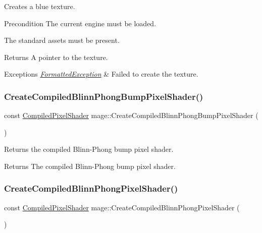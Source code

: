 Creates a blue texture.

\begin{DoxyPrecond}{Precondition}
The current engine must be loaded. 

The standard assets must be present. 
\end{DoxyPrecond}
\begin{DoxyReturn}{Returns}
A pointer to the texture. 
\end{DoxyReturn}

\begin{DoxyExceptions}{Exceptions}
{\em \hyperlink{structmage_1_1_formatted_exception}{Formatted\+Exception}} & Failed to create the texture. \\
\hline
\end{DoxyExceptions}
\hypertarget{namespacemage_a21628580bef67e16e3a9a748cd9abd68}{}\label{namespacemage_a21628580bef67e16e3a9a748cd9abd68} 
\subsubsection{\texorpdfstring{Create\+Compiled\+Blinn\+Phong\+Bump\+Pixel\+Shader()}{CreateCompiledBlinnPhongBumpPixelShader()}}
{\footnotesize\ttfamily const \hyperlink{structmage_1_1_compiled_pixel_shader}{Compiled\+Pixel\+Shader} mage\+::\+Create\+Compiled\+Blinn\+Phong\+Bump\+Pixel\+Shader (\begin{DoxyParamCaption}{ }\end{DoxyParamCaption})}

Returns the compiled Blinn-\/\+Phong bump pixel shader.

\begin{DoxyReturn}{Returns}
The compiled Blinn-\/\+Phong bump pixel shader. 
\end{DoxyReturn}
\hypertarget{namespacemage_a0540fe531beb5bc292f29a6953a32939}{}\label{namespacemage_a0540fe531beb5bc292f29a6953a32939} 
\subsubsection{\texorpdfstring{Create\+Compiled\+Blinn\+Phong\+Pixel\+Shader()}{CreateCompiledBlinnPhongPixelShader()}}
{\footnotesize\ttfamily const \hyperlink{structmage_1_1_compiled_pixel_shader}{Compiled\+Pixel\+Shader} mage\+::\+Create\+Compiled\+Blinn\+Phong\+Pixel\+Shader (\begin{DoxyParamCaption}{ }\end{DoxyParamCaption})}

